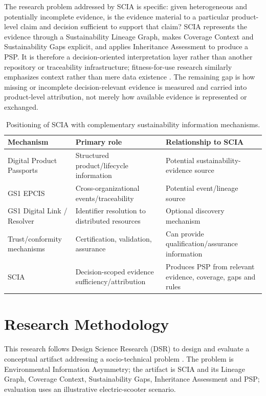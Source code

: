 \documentclass[english]{lni}
\begin{document}
The research problem addressed by SCIA is specific: given heterogeneous and potentially incomplete evidence, is the evidence material to a particular product-level claim and decision sufficient to support that claim? SCIA represents the evidence through a Sustainability Lineage Graph, makes Coverage Context and Sustainability Gaps explicit, and applies Inheritance Assessment to produce a PSP. It is therefore a decision-oriented interpretation layer rather than another repository or traceability infrastructure; fitness-for-use research similarly emphasizes context rather than mere data existence \cite{WS96}. The remaining gap is how missing or incomplete decision-relevant evidence is measured and carried into product-level attribution, not merely how available evidence is represented or exchanged.

\begin{table}[ht]
\centering
\caption{Positioning of SCIA with complementary sustainability information mechanisms.}
\small
\begin{tabularx}{\textwidth}{>{\raggedright\arraybackslash}p{}>{\raggedright\arraybackslash}p{}X}
\toprule
\textbf{Mechanism} & \textbf{Primary role} & \textbf{Relationship to SCIA}\\
\midrule
Digital Product Passports & Structured product/lifecycle information & Potential sustainability-evidence source\\
GS1 EPCIS & Cross-organizational events/traceability & Potential event/lineage source\\
GS1 Digital Link / Resolver & Identifier resolution to distributed resources & Optional discovery mechanism\\
Trust/conformity mechanisms & Certification, validation, assurance & Can provide qualification/assurance information\\
SCIA & Decision-scoped evidence sufficiency/attribution & Produces PSP from relevant evidence, coverage, gaps and rules\\
\bottomrule
\end{tabularx}
\end{table}
\FloatBarrier

\section{Research Methodology}
This research follows Design Science Research (DSR) to design and evaluate a conceptual artifact addressing a socio-technical problem \cite{He04,Pe07}. The problem is Environmental Information Asymmetry; the artifact is SCIA and its Lineage Graph, Coverage Context, Sustainability Gaps, Inheritance Assessment and PSP; evaluation uses an illustrative electric-scooter scenario.
\end{document}
